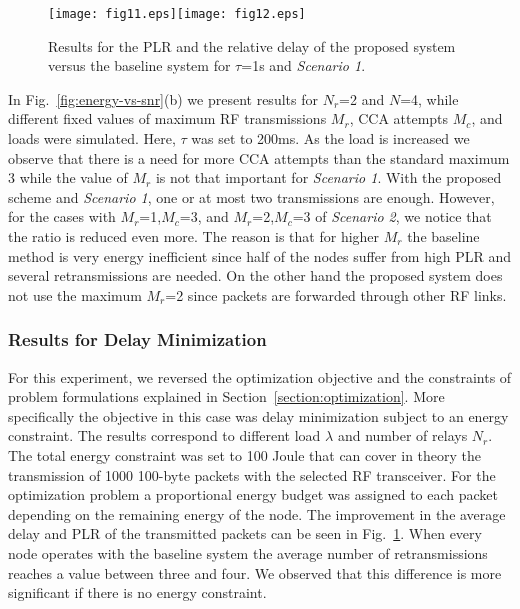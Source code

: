 \documentclass[10pt]{IEEEtran}
\newcounter{section:outage-analysis}
\begin{document}
\begin{figure}[t]
\begin{center}
\texttt{[image: fig11.eps]}\hspace{-0.2cm}\texttt{[image: fig12.eps]}
\caption{Results for the PLR and the relative delay of the proposed system versus the baseline system for $\tau$=1s and \emph{Scenario 1}.}
  \label{fig:latency-vs-load}
\end{center}
\end{figure}

In Fig.~\ref{fig:energy-vs-snr}(b) we present results for $N_r$=2 and $N$=4, while different fixed values of maximum RF transmissions $M_r$, CCA attempts $M_c$, and loads were simulated. Here, $\tau$ was set to 200ms. As the load is increased we observe that there is a need for more CCA attempts than the standard maximum 3 while the value of $M_r$ is not that important for \emph{Scenario 1}. With the proposed scheme and \emph{Scenario 1}, one or at most two transmissions are enough. However, for the cases with $M_r$=1,$M_c$=3, and $M_r$=2,$M_c$=3 of \emph{Scenario 2}, we notice that the ratio is reduced even more. The reason is that for higher $M_r$ the baseline method is very energy inefficient since half of the nodes suffer from high PLR and several retransmissions are needed. On the other hand the proposed system does not use the maximum $M_r$=2 since packets are forwarded through other RF links.

\subsubsection{Results for Delay Minimization}
For this experiment, we reversed the optimization objective and the constraints of problem formulations explained in Section~\ref{section:optimization}. More specifically the objective in this case was delay minimization subject to an energy constraint. The results correspond to different load $\lambda$ and number of relays $N_r$. The total energy constraint was set to 100 Joule that can cover in theory the transmission of 1000 100-byte packets with the selected RF transceiver. For the optimization problem a proportional energy budget was assigned to each packet depending on the remaining energy of the node. The improvement in the average delay and PLR of the transmitted packets can be seen in Fig.~\ref{fig:latency-vs-load}. When every node operates with the baseline system the average number of retransmissions reaches a value between three and four. We observed that this difference is more significant if there is no energy constraint.
\end{document}
